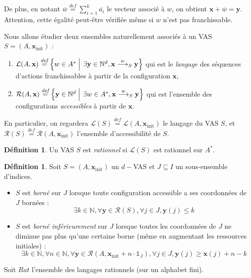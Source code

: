 \documentclass[a4paper,final]{article}
\theoremstyle{definition}
\newtheorem{Definition}[Theorem]{Définition}
\let\leq\leqslant
\let\geq\geqslant
\newcommand{\set}[2]{\left\{#1\mathrel{\left|\vphantom{#1}\vphantom{#2}\right.}#2\right\}}
\newcommand{\defeq}{\ensuremath{\stackrel{\textit{def}}{=}}}
\newcommand{\N}{\ensuremath{\mathbb{N}}}
\newcommand{\indicatrice}[1]{\ensuremath{\mathds{1}_{#1}}}
\newcommand{\lang}{\ensuremath{\mathcal{L}}}
\newcommand{\reach}{\ensuremath{\mathcal{R}}}
\newcommand{\trans}[2]{\ensuremath{\stackrel{#1}{\longrightarrow}_{#2}}}
\newcommand{\vect}[1]{\ensuremath{\mathbf{#1}}}
\newcommand{\xinit}{\ensuremath{\vect{x}_\text{init}}}
\newcommand{\valeur}[1]{\ensuremath{\overline{#1}}}
\begin{document}
De plus, en notant $\valeur{w}\defeq \sum^k_{i=1} \valeur{a_i}$ le vecteur associé à $w$, on obtient $\vect{x} +\valeur{w} = \vect{y}$.
Attention, cette égalité peut-être vérifiée même si $w$ n'est pas franchissable.
\vspace{3mm}

Nous allons étudier deux ensembles naturellement associés à un VAS $S=(A,\xinit)$ :
\begin{enumerate}
    \item 
    $\lang(A,\vect{x})\defeq \set{w\in A^\ast} {\exists \vect{y}\in\N^d, \vect{x}\trans{w}{S}\vect{y}}$ qui est le \emph{langage} des séquences d'actions franchissables à partir de la configuration $\vect{x}$,
    
    \item $\reach(A,\vect{x})\defeq \set{\vect{y}\in\N^d} {\exists w\in A^\ast, \vect{x}\trans{w}{S} \vect{y}}$ qui est l'ensemble des configurations \emph{accessibles} à partir de $\vect{x}$. 
\end{enumerate}

En particulier, on regardera $\lang(S) \defeq \lang(A,\xinit)$ le langage du VAS $S$, et $\reach(S) \defeq \reach(A,\xinit)$ l'ensemble d'accessibilité de $S$.

\begin{Definition}
Un VAS $S$ est \emph{rationnel} si $\lang(S)$ est rationnel sur $A^\ast$.
\end{Definition}

\begin{Definition}
Soit $S = (A,\xinit)$ un $d-$VAS et $J\subseteq I$ un sous-ensemble d'indices.
\begin{itemize}
    \item $S$ est \emph{borné} sur $J$ lorsque toute configuration accessible a ses coordonnées de $J$ bornées :
    $$\exists k\in\N, \forall \vect{y}\in\reach(S), \forall j\in J, \vect{y}(j)\leq k$$
    
    \item $S$ est \emph{borné inférieurement} sur $J$ lorsque toutes les coordonnées de $J$ ne diminue pas plus qu'une certaine borne (même en augmentant les ressources initiales) :
    $$\exists k\in\N, \forall n\in\N, \forall \vect{y}\in\reach(A,\xinit + n\cdot\indicatrice{J}), \forall j\in J, \vect{y}(j)\geq \vect{x}(j)+n-k$$
\end{itemize}
\end{Definition}

Soit $Rat$ l'ensemble des langages rationnels (sur un alphabet fini).
\end{document}
